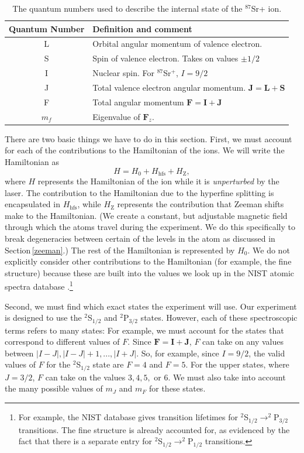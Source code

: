 \begin{table}[h!]
\centering
\begin{tabular}{|c|l|}
\hline
Quantum Number & Definition and comment \\ \hline \hline
L & Orbital angular momentum of valence electron. \\ \hline
S & Spin of valence electron. Takes on values $\pm 1/2$ \\ \hline
I & Nuclear spin. For $^{87}$Sr$^+$, $I=9/2$ \\ \hline
J & Total valence electron angular momentum. $\mathbf{J}=\mathbf{L}+\mathbf{S}$ \\ \hline
F & Total angular momentum $\mathbf{F}=\mathbf{I}+\mathbf{J}$ \\ \hline
$m_f$ & Eigenvalue of $\mathbf{F}_z$.\\ \hline
\end{tabular}
\caption{The quantum numbers used to describe the internal state of the $^{87}$Sr+ ion.}
\label{quantumNumberQuickref}
\end{table}

There are two basic things we have to do in this section. First, we must account for each of the contributions to the Hamiltonian of the ions. We will write the Hamiltonian as 
\begin{equation}
H=H_0+H_{\mathrm{hfs}}+H_{\mathrm{Z}},\label{Hoverall}
\end{equation}
where $H$ represents the Hamiltonian of the ion while it is \emph{unperturbed} by the laser. The contribution to the Hamiltonian due to the hyperfine splitting is encapsulated in $H_{\mathrm{hfs}}$, while $H_{\mathrm{Z}}$ represents the contribution that Zeeman shifts make to the Hamiltonian. (We create a constant, but adjustable magnetic field through which the atoms travel during the experiment. We do this specifically to break degeneracies between certain of the levels in the atom as discussed in Section\,\ref{zeeman}.) The rest of the Hamiltonian is represented by $H_0$. We do not explicitly consider other contributions to the Hamiltonian (for example, the fine structure) because these are built into the values we look up in the NIST atomic spectra database \cite{NISTasd}.\footnote{For example, the NIST database gives transition lifetimes for $^2$S$_{1/2}\rightarrow^2$P$_{3/2}$ transitions. The fine structure is already accounted for, as evidenced by the fact that there is a separate entry for $^2$S$_{1/2}\rightarrow^2$P$_{1/2}$ transitions.}

Second, we must find which exact states the experiment will use.
Our experiment is designed to use the $^2$S$_{1/2}$ and $^2$P$_{3/2}$ states. However, each of these spectroscopic terms refers to many states: For example, we must account for the states that correspond to different values of $F$. Since $\mathbf{F}=\mathbf{I}+\mathbf{J}$, $F$ can take on any values between $|I-J|,|I-J|+1,...,|I+J|$. So, for example, since $I=9/2$, the valid values of $F$ for the $^2$S$_{1/2}$ state are $F=4$ and $F=5$. For the upper states, where $J=3/2$, $F$ can take on the values $3,4,5,$ or $6$. We must also take into account the many possible values of $m_J$ and $m_F$ for these states.

